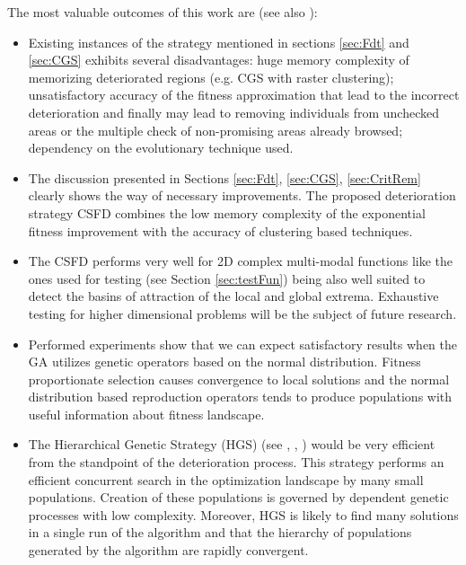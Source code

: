 The most valuable outcomes of this work are (see also \cite{SchaeferWolny2011}):
\begin{itemize}

\item Existing instances of the strategy mentioned in sections \ref{sec:Fdt} and
\ref{sec:CGS} exhibits several disadvantages: 
huge memory complexity of memorizing deteriorated regions
(e.g. CGS with raster clustering); 
unsatisfactory accuracy of the fitness approximation 
that lead to the incorrect deterioration and finally may lead to removing
individuals from unchecked areas or the multiple check of non-promising areas
already browsed; 
dependency on the evolutionary technique used.

\item
The discussion presented in Sections \ref{sec:Fdt}, \ref{sec:CGS}, \ref{sec:CritRem}
clearly shows the way of necessary improvements.
The proposed deterioration strategy CSFD combines the low memory complexity
of the exponential fitness improvement with the accuracy of
clustering based techniques.

\item
The CSFD performs very well for 2D complex multi-modal functions like the ones
used for testing (see Section \ref{sec:testFun}) being also well suited to detect
the basins of attraction of the local and global extrema.
Exhaustive testing for higher dimensional problems will be the subject
of future research.

\item
Performed experiments show that we can expect satisfactory results 
when the GA utilizes
genetic operators based on the normal distribution. 
Fitness proportionate selection causes convergence to local solutions 
and the normal distribution based reproduction operators tends 
to produce populations with useful information about fitness landscape.

\item
The Hierarchical Genetic Strategy (HGS)
(see \cite{SchaeferKolodziej2003},
\cite{SchaeferAdamskaTelega2004},
\cite{WierzbaSemczukKolodziejSchaefer2003})
would be very efficient 
from the standpoint of the deterioration process.
This strategy performs an efficient concurrent
search in the optimization landscape by many small populations. Creation of
these populations is governed by dependent genetic processes with low complexity.
Moreover, HGS is likely to find many solutions in a
single run of the algorithm and that the hierarchy of populations generated
by the algorithm are rapidly convergent. 



\end{itemize}
